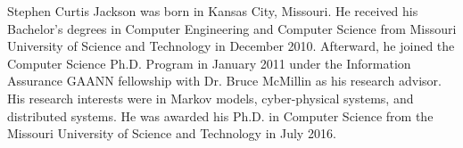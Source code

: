 Stephen Curtis Jackson was born in Kansas City, Missouri.
He received his Bachelor's degrees in Computer Engineering and Computer Science from Missouri University of Science and Technology in December 2010.
Afterward, he joined the Computer Science Ph.D. Program in January 2011 under the Information Assurance GAANN fellowship with Dr. Bruce McMillin as his research advisor.
His research interests were in Markov models, cyber-physical systems, and distributed systems.
He was awarded his Ph.D. in Computer Science from the Missouri University of Science and Technology in July 2016.
